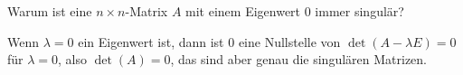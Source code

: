 Warum ist eine $n\times n$-Matrix $A$ mit einem Eigenwert 0
immer singulär?

\begin{loesung}
Wenn $\lambda=0$ ein Eigenwert ist, dann ist $0$ eine Nullstelle
von $\det(A-\lambda E)=0$ für $\lambda=0$, also $\det(A)=0$,
das sind aber genau die singulären Matrizen.
\end{loesung}


